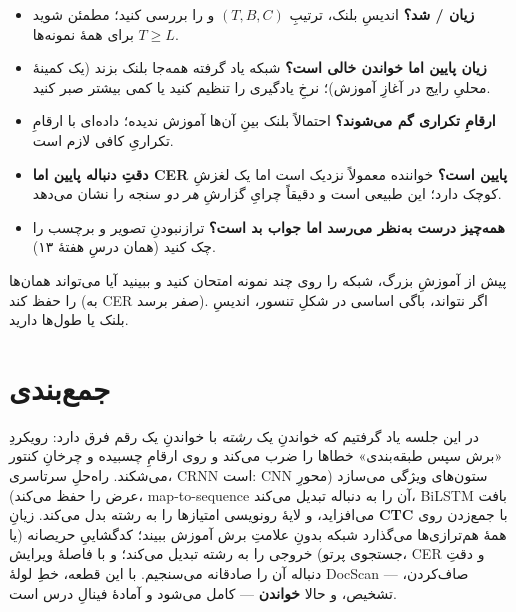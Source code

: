 \documentclass[12pt,a4paper]{article}
\begin{document}
\begin{itemize}
  \item \textbf{زیان / شد؟} اندیسِ بلنک، ترتیبِ $(T,B,C)$ و  را بررسی کنید؛ مطمئن شوید $T \ge L$ برای همهٔ نمونه‌ها.
  \item \textbf{زیان پایین اما خواندن خالی است؟} شبکه یاد گرفته همه‌جا بلنک بزند (یک کمینهٔ محلیِ رایج در آغازِ آموزش)؛ نرخِ یادگیری را تنظیم کنید یا کمی بیشتر صبر کنید.
  \item \textbf{ارقامِ تکراری گم می‌شوند؟} احتمالاً بلنک بینِ آن‌ها آموزش ندیده؛ داده‌ای با ارقامِ تکراریِ کافی لازم است.
  \item \textbf{دقتِ دنباله پایین اما CER پایین است؟} خواننده معمولاً نزدیک است اما یک لغزشِ کوچک دارد؛ این طبیعی است و دقیقاً چرایِ گزارشِ \emph{هر دو} سنجه را نشان می‌دهد.
  \item \textbf{همه‌چیز درست به‌نظر می‌رسد اما جواب بد است؟} تراز‌نبودنِ تصویر و برچسب را چک کنید (همان درسِ هفتهٔ ۱۳).
\end{itemize}

\begin{hoshdar}
پیش از آموزشِ بزرگ، شبکه را روی چند نمونه امتحان کنید و ببینید آیا می‌تواند همان‌ها را حفظ کند (به CERِ صفر برسد). اگر نتواند، باگی اساسی در شکلِ تنسور، اندیسِ بلنک یا طول‌ها دارید.
\end{hoshdar}

\section{جمع‌بندی}

در این جلسه یاد گرفتیم که خواندنِ یک \emph{رشته} با خواندنِ یک رقم فرق دارد: رویکردِ «برش سپس طبقه‌بندی» خطاها را ضرب می‌کند و روی ارقامِ چسبیده و چرخانِ کنتور می‌شکند. راه‌حلِ سرتاسری، CRNN است: CNN ستون‌های ویژگی می‌سازد (محورِ عرض را حفظ می‌کند)، map-to-sequence آن را به دنباله تبدیل می‌کند، BiLSTM بافت می‌افزاید، و لایهٔ رونویسی امتیازها را به رشته بدل می‌کند. زیانِ \textbf{CTC} با جمع‌زدن روی همهٔ هم‌ترازی‌ها می‌گذارد شبکه بدونِ علامتِ برش آموزش ببیند؛ کدگشاییِ حریصانه (یا جستجوی پرتو) خروجی را به رشته تبدیل می‌کند؛ و با فاصلهٔ ویرایش، CER و دقتِ دنباله آن را صادقانه می‌سنجیم. با این قطعه، خطِ لولهٔ DocScan — صاف‌کردن، تشخیص، و حالا \textbf{خواندن} — کامل می‌شود و آمادهٔ فینالِ درس است.
\end{document}
